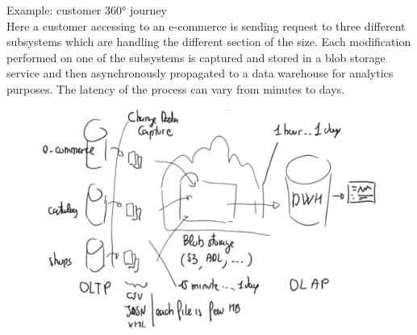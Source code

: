 \documentclass[10pt,a4paper]{article}
\begin{document}
Example: customer 360° journey \\
Here a customer accessing to an e-commerce is sending request to three different subsystems which are handling the different section of the size. Each modification performed on one of the subsystems is captured and stored in a blob storage service and then asynchronously propagated to a data warehouse for analytics purposes. The latency of the process can vary from minutes to days.
\begin{figure}[ht!]
 \hfill \includegraphics[width=350pt]{images/batch-case.png}\hspace*{\fill}
\end{figure}  
\end{document}

